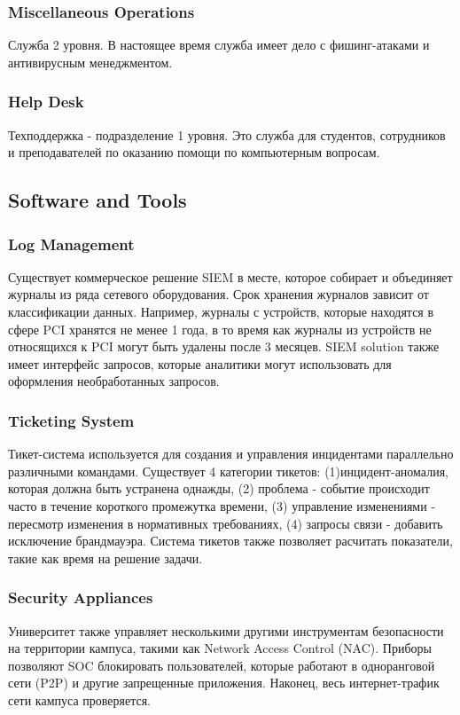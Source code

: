 \documentclass[12pt,]{article}
\begin{document}
\subsubsection{Miscellaneous Operations}
Служба 2 уровня. В настоящее время служба имеет дело с фишинг-атаками и антивирусным менеджментом.
\subsubsection{Help Desk}
Техподдержка - подразделение 1 уровня. Это служба для студентов, сотрудников и преподавателей по оказанию помощи по компьютерным вопросам.
\subsection{Software and Tools}
\subsubsection{Log Management}
Существует коммерческое решение SIEM в месте, которое собирает и объединяет журналы из ряда сетевого оборудования. Срок хранения журналов зависит от классификации данных. Например, журналы с устройств, которые находятся в сфере PCI хранятся не менее 1 года, в то время как журналы из устройств не относящихся к PCI могут быть удалены после 3 месяцев. SIEM solution также имеет интерфейс запросов, которые аналитики могут использовать для оформления необработанных запросов.
\subsubsection{Ticketing System}
Тикет-система используется для создания и управления инцидентами параллельно различными командами. Существует 4 категории тикетов: (1)инцидент-аномалия, которая должна быть устранена однажды, (2) проблема - событие происходит часто в течение короткого промежутка времени, (3) управление изменениями - пересмотр изменения в нормативных требованиях, (4) запросы связи - добавить исключение брандмауэра. Система тикетов также позволяет расчитать показатели, такие как время на решение задачи.
\subsubsection{Security Appliances}
Университет также управляет несколькими другими инструментам безопасности на территории кампуса, такими как Network Access Control (NAC). Приборы позволяют SOC блокировать пользователей, которые работают в одноранговой сети (P2P) и другие запрещенные приложения. Наконец, весь интернет-трафик сети кампуса проверяется.
\end{document}
